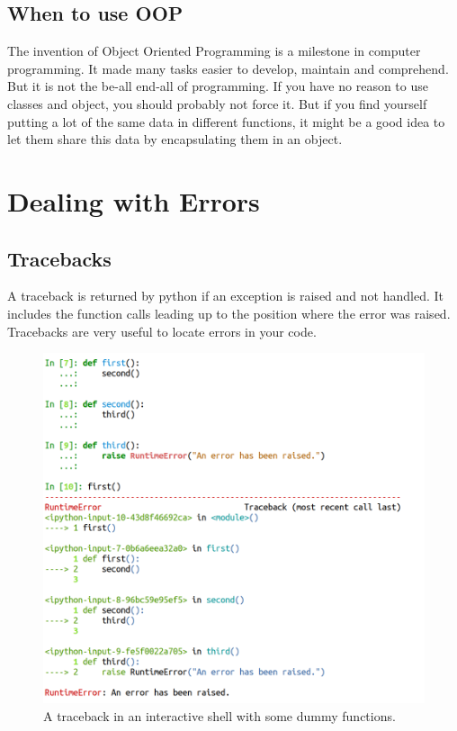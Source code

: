 \documentclass{article}
\begin{document}
\subsection{When to use OOP}

The invention of Object Oriented Programming is a milestone in computer programming.
It made many tasks easier to develop, maintain and comprehend.
But it is not the be-all end-all of programming.
If you have no reason to use classes and object, you should probably not force it.
But if you find yourself putting a lot of the same data in different functions,
it might be a good idea to let them share this data by encapsulating them
in an object.


\section{Dealing with Errors}

\subsection{Tracebacks}

A traceback is returned by python if an exception is raised and not handled.
It includes the function calls leading up to the position where the error was raised.
Tracebacks are very useful to locate errors in your code.

\begin{figure}[h]
    \centering
    \includegraphics[width=.8\textwidth]{traceback.png}
    \caption{A traceback in an interactive shell with some dummy functions.}
    \label{traceback}
\end{figure}
\end{document}
